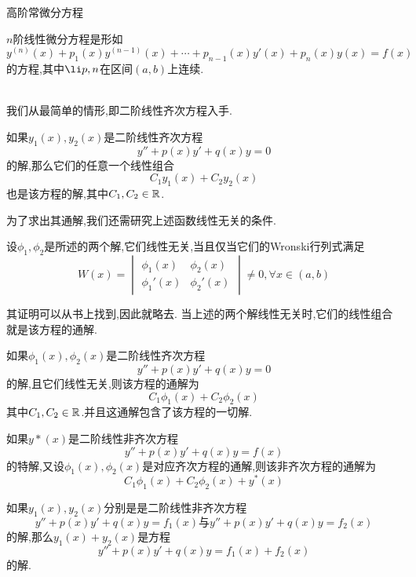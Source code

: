 \documentclass{ctexart}
\begin{document}
\pagestyle{empty}
\begin{center}\large 高阶常微分方程\end{center}
\begin{definition}[0.1 定义:$n$阶线性微分方程]
    $n$阶线性微分方程是形如
    \[y^{(n)}(x)+p_1(x)y^{(n-1)}(x)+\cdots+p_{n-1}(x)y'(x)+p_{n}(x)y(x)=f(x)\]
    的方程,其中$\li p,n$在区间$(a,b)$上连续.
\end{definition}\noindent
{}\\
我们从最简单的情形,即二阶线性齐次方程入手.
\begin{formal}[1.1 二阶线性齐次方程的解]
    如果$y_1(x),y_2(x)$是二阶线性齐次方程
    \[y''+p(x)y'+q(x)y=0\]
    的解,那么它们的任意一个线性组合
    \[C_1y_1(x)+C_2y_2(x)\]
    也是该方程的解,其中$C_1,C_2\in\mathbb{R}$.
\end{formal}\noindent
为了求出其通解,我们还需研究上述函数线性无关的条件.
\begin{formal}[1.2 函数线性无关的充要条件]
    设$\phi_1,\phi_2$是所述的两个解,它们线性无关,当且仅当它们的Wronski行列式满足
    \[W(x)=\begin{vmatrix}
        \phi_1(x)&\phi_2(x)\\\phi_1'(x)&\phi_2'(x)
    \end{vmatrix}\neq0,\forall x\in(a,b)\]
\end{formal}\noindent
其证明可以从书上找到,因此就略去.%
当上述的两个解线性无关时,它们的线性组合就是该方程的通解.
\begin{formal}[1.3 二阶线性齐次方程的通解]
    如果$\phi_1(x),\phi_2(x)$是二阶线性齐次方程
    \[y''+p(x)y'+q(x)y=0\]
    的解,且它们线性无关,则该方程的通解为
    \[C_1\phi_1(x)+C_2\phi_2(x)\]
    其中$C_1,C_2\in\mathbb{R}$.并且这通解包含了该方程的一切解.
\end{formal}
\begin{formal}[1.4 二阶线性非齐次方程的通解]
    如果$y*(x)$是二阶线性非齐次方程
    \[y''+p(x)y'+q(x)y=f(x)\]
    的特解,又设$\phi_1(x),\phi_2(x)$是对应齐次方程的通解,则该非齐次方程的通解为
    \[C_1\phi_1(x)+C_2\phi_2(x)+y^*(x)\]
\end{formal}
\begin{formal}[1.5 二阶线性非齐次方程的加和性]
    如果$y_1(x),y_2(x)$分别是是二阶线性非齐次方程
    \[y''+p(x)y'+q(x)y=f_1(x)\text{与}y''+p(x)y'+q(x)y=f_2(x)\]
    的解,那么$y_1(x)+y_2(x)$是方程
    \[y''+p(x)y'+q(x)y=f_1(x)+f_2(x)\]
    的解.
\end{formal}
\noindent{}
\end{document}
